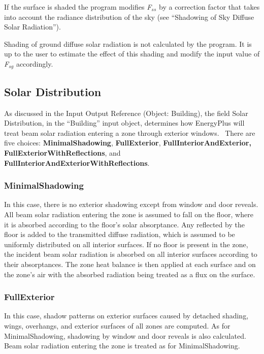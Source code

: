 If the surface is shaded the program modifies \emph{F\(_{ss}\)} by a correction factor that takes into account the radiance distribution of the sky (see ``Shadowing of Sky Diffuse Solar Radiation'').

Shading of ground diffuse solar radiation is not calculated by the program. It is up to the user to estimate the effect of this shading and modify the input value of \emph{F\(_{sg}\)} accordingly.

\subsection{Solar Distribution}\label{solar-distribution}

As discussed in the Input Output Reference (Object: Building), the field Solar Distribution, in the ``Building'' input object, determines how EnergyPlus will treat beam solar radiation entering a zone through exterior windows.~ There are five choices: \textbf{MinimalShadowing}, \textbf{FullExterior}, \textbf{FullInteriorAndExterior, FullExteriorWithReflections}, and \textbf{FullInteriorAndExteriorWithReflections}.

\subsubsection{MinimalShadowing}\label{minimalshadowing}

In this case, there is no exterior shadowing except from window and door reveals. All beam solar radiation entering the zone is assumed to fall on the floor, where it is absorbed according to the floor's solar absorptance. Any reflected by the floor is added to the transmitted diffuse radiation, which is assumed to be uniformly distributed on all interior surfaces. If no floor is present in the zone, the incident beam solar radiation is absorbed on all interior surfaces according to their absorptances. The zone heat balance is then applied at each surface and on the zone's air with the absorbed radiation being treated as a flux on the surface.

\subsubsection{FullExterior}\label{fullexterior}

In this case, shadow patterns on exterior surfaces caused by detached shading, wings, overhangs, and exterior surfaces of all zones are computed. As for MinimalShadowing, shadowing by window and door reveals is also calculated. Beam solar radiation entering the zone is treated as for MinimalShadowing.

